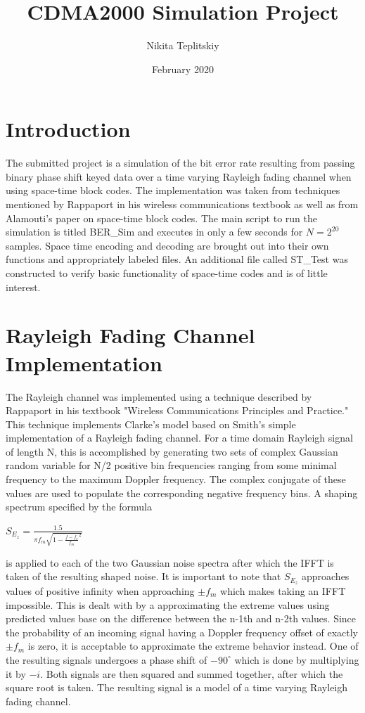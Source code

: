 \documentclass[twocolumn]{article}
\title{CDMA2000 Simulation Project}
\author{Nikita Teplitskiy }
\date{February 2020}
\begin{document}
\maketitle

\section{Introduction}

The submitted project is a simulation of the bit error rate resulting from passing binary phase shift keyed data over a time varying Rayleigh fading channel when using space-time block codes. The implementation was taken from techniques mentioned by Rappaport in his wireless communications textbook as well as from Alamouti's paper on space-time block codes. The main script to run the simulation is titled BER\_Sim and executes in only a few seconds for $N = 2^{20}$ samples. Space time encoding and decoding are brought out into their own functions and appropriately labeled files. An additional file called ST\_Test was constructed to verify basic functionality of space-time codes and is of little interest. 


\section{Rayleigh Fading Channel \newline Implementation}

The Rayleigh channel was implemented using a technique described by Rappaport in his 
textbook "Wireless Communications Principles and Practice." This technique implements 
Clarke's model based on Smith's simple implementation of a Rayleigh fading channel.
For a time domain Rayleigh signal of length N, this is accomplished by generating two sets of  
complex Gaussian random variable for N/2 positive bin frequencies ranging from some 
minimal frequency to the maximum Doppler frequency. The complex conjugate of these
values are used to populate the corresponding negative frequency bins. A shaping 
spectrum specified by the formula 

\begin{center}
\centering $S_{E_z} = \frac{1.5}{\pi f_m \sqrt{1 - \frac{f - f_c}{f_m }^2}}$ 
\end{center}

is applied to each of the two Gaussian 
noise spectra after which the IFFT is taken of the resulting shaped noise. It is 
important to note that $S_{E_z}$ approaches values of positive infinity when approaching 
$\pm f_m$ which makes taking an IFFT impossible. This is dealt with by a approximating the 
extreme values using predicted values base on the difference between the n-1th and n-2th values. 
Since the probability of an incoming signal having a Doppler frequency offset of exactly $\pm f_m$
is zero, it is acceptable to approximate the extreme behavior instead. One of the resulting
signals undergoes a phase shift of $-90^{\circ}$ which is done by multiplying it by $-i$. Both
signals are then squared and summed together, after which the square root is taken. The 
resulting signal is a model of a time varying Rayleigh fading channel. 
\end{document}
